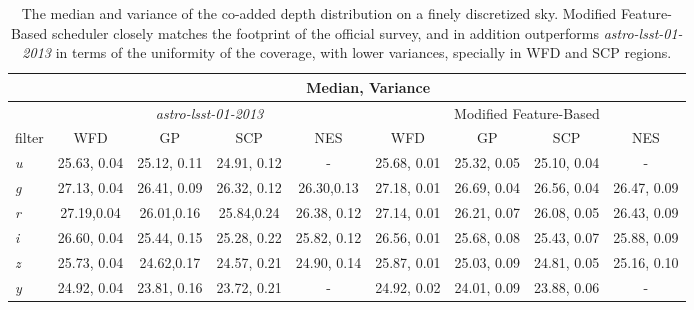 \documentclass[12pt]{aastex62}
\theoremstyle{definition}
\begin{document}
\begin{table}
\caption{The median and variance of the co-added depth distribution on a finely discretized sky. Modified Feature-Based scheduler closely matches the footprint of the official survey, and in addition outperforms \textit{astro-lsst-01-2013} in terms of the uniformity of the coverage, with lower variances, specially in WFD and SCP regions.}\label{table_10yrs_hist}
\begin{center}
\begin{tabular}{l|cccc|cccc} \hline
&\multicolumn{8}{c}{Median, Variance} \\ \hline
&\multicolumn{4}{c|}{\textit{astro-lsst-01-2013}} &\multicolumn{4}{c}{Modified Feature-Based} \\
filter  & WFD & GP & SCP & NES & WFD & GP & SCP & NES\\
\hline
\textit{u}& 25.63, 0.04 & 25.12, 0.11& 24.91, 0.12& - &25.68, 0.01 &25.32, 0.05 & 25.10, 0.04& -\\
\textit{g}& 27.13, 0.04 & 26.41, 0.09& 26.32, 0.12 & 26.30,0.13& 27.18, 0.01 & 26.69, 0.04&26.56, 0.04 &26.47, 0.09 \\
\textit{r}& 27.19,0.04 & 26.01,0.16& 25.84,0.24 & 26.38, 0.12 & 27.14, 0.01& 26.21, 0.07 & 26.08, 0.05 & 26.43, 0.09\\
\textit{i}& 26.60, 0.04 & 25.44, 0.15 & 25.28, 0.22 & 25.82, 0.12 & 26.56, 0.01 & 25.68, 0.08 & 25.43, 0.07 & 25.88, 0.09\\
\textit{z}& 25.73, 0.04& 24.62,0.17& 24.57, 0.21& 24.90, 0.14 & 25.87, 0.01 & 25.03, 0.09 & 24.81, 0.05 & 25.16, 0.10\\
\textit{y}& 24.92, 0.04 & 23.81, 0.16 & 23.72, 0.21& - & 24.92, 0.02 & 24.01, 0.09 &23.88, 0.06 & -\\
\end{tabular}
\end{center}
\end{table}

\end{document}
